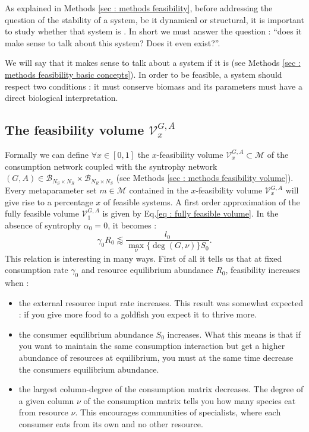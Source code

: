 \documentclass[12pt, titlepage]{report}
\begin{document}
As explained in Methods \ref{sec : methods feasibility}, before addressing the question of the stability of a system, be it dynamical or structural, it is important to study whether that system is . In short we must answer the question : ``does it make sense to talk about this system? Does it even exist?''.

We will say that it makes sense to talk about a system if it is  (see Methods \ref{sec : methods feasibility basic concepts}). In order to be feasible, a system should respect two conditions : it must conserve biomass and its parameters must have a direct biological interpretation.

\subsection{The feasibility volume $\mathcal{V}^{G,A}_x$}
Formally we can define $\forall x \in [0,1]$ the $x$-feasibility volume $\mathcal{V}^{G,A}_x \subset \mathcal{M}$ of the consumption network coupled with the syntrophy network $(G, A) \in \mathcal{B}_{N_S \times N_R} \times  \mathcal{B}_{N_R \times N_S}$ (see Methods \ref{sec : methods feasibility volume}). Every metaparameter set $m \in \mathcal{M}$ contained in the $x$-feasibility volume $\mathcal{V}^{G,A}_x$ will give rise to a percentage $x$ of feasible systems. A first order approximation of the fully feasible volume $\mathcal{V}^{G,A}_1$ is given by Eq.\eqref{eq : fully feasible volume}.
In the absence of syntrophy $\alpha_0=0$, it becomes :
\begin{equation}
\gamma_0 R_0 \lessapprox \frac{l_0}{\max_\nu\{\deg(G,\nu)\}S_0}. \label{eq : fully feasible volume no syntrophy}
\end{equation}
This relation is interesting in many ways. First of all it tells us that at fixed consumption rate $\gamma_0$ and resource equilibrium abundance $R_0$, feasibility increases when :
\begin{itemize}
\item the external resource input rate increases. This result was somewhat expected : if you give more food to a goldfish you expect it to thrive more.
\item the consumer equilibrium abundance $S_0$ increases. What this means is that if you want to maintain the same consumption interaction but get a higher abundance of resources at equilibrium, you must at the same time decrease the consumers equilibrium abundance.
\item the largest column-degree of the consumption matrix decreases. The degree of a given column $\nu$ of the consumption matrix tells you how many species eat from resource $\nu$. This encourages communities of specialists, where each consumer eats from its own and no other resource.
\end{itemize}
\end{document}
